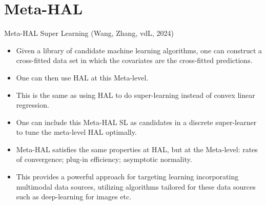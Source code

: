 \documentclass[t]{beamer}
\newlength{\wideitemsep}
\let\olditem\item
\renewcommand{\item}{\setlength{\itemsep}{\wideitemsep}\olditem}
\begin{document}
\section{Meta-HAL}
\begin{frame}{Meta-HAL Super Learning (Wang, Zhang, vdL, 2024)}
\begin{itemize}
\item Given a library of candidate machine learning algorithms, one can construct a cross-fitted data set in which the covariates are the cross-fitted predictions.
\item One can then use HAL at this Meta-level.
\item This is the same as using HAL to do super-learning instead of convex linear regression.
\item One can include this Meta-HAL SL as candidates in a discrete super-learner to tune the meta-level HAL optimally.
\item Meta-HAL satisfies the same properties at HAL, but at the Meta-level: rates of convergence; plug-in efficiency; asymptotic normality.
\item This provides a powerful approach for targeting learning incorporating multimodal data sources, utilizing algorithms tailored for these data sources such as deep-learning for images etc.
\end{itemize}
\end{frame}
\end{document}
